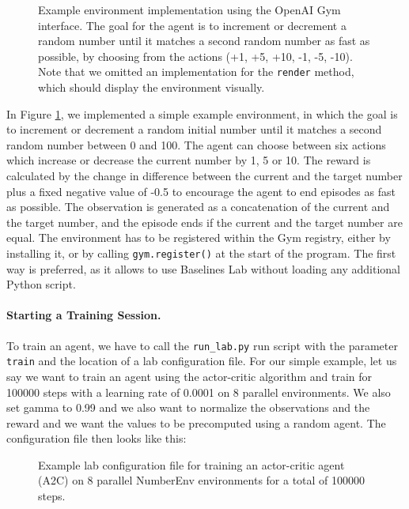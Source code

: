 \begin{figure}[p]
    \begin{center}
    \end{center}
    \caption[Example Implementation of a Simple Environment]{Example environment implementation using the OpenAI Gym interface. The goal for the agent is to increment or decrement a random number until it matches a second random number as fast as possible, by choosing from the actions (+1, +5, +10, -1, -5, -10). Note that we omitted an implementation for the \texttt{render} method, which should display the environment visually.} \label{fig:EnvironmentExampleImplementation}
\end{figure}

In Figure \ref{fig:EnvironmentExampleImplementation}, we implemented a simple example environment, in which the goal is to increment or decrement a random initial number until it matches a second random number between 0 and 100. The agent can choose between six actions which increase or decrease the current number by 1, 5 or 10. The reward is calculated by the change in difference between the current and the target number plus a fixed negative value of -0.5 to encourage the agent to end episodes as fast as possible. The observation is generated as a concatenation of the current and the target number, and the episode ends if the current and the target number are equal. The environment has to be registered within the Gym registry, either by installing it, or by calling \texttt{gym.register()} at the start of the program. The first way is preferred, as it allows to use Baselines Lab without loading any additional Python script.

\paragraph{Starting a Training Session.}
To train an agent, we have to call the \texttt{run\_lab.py} run script with the parameter \texttt{train} and the location of a lab configuration file. For our simple example, let us say we want to train an agent using the actor-critic algorithm and train for 100000 steps with a learning rate of 0.0001 on 8 parallel environments. We also set gamma to 0.99 and we also want to normalize the observations and the reward and we want the values to be precomputed using a random agent. The configuration file then looks like this:

\begin{figure}[h]
    
    \caption[Lab Configuration File for the Number Environment]{Example lab configuration file for training an actor-critic agent (A2C) on 8 parallel NumberEnv environments for a total of 100000 steps.}
    \label{fig:NumberEnvConfig}
\end{figure}


